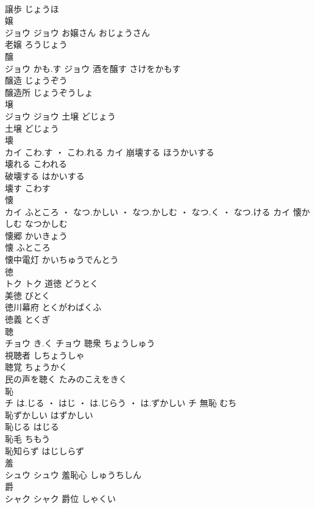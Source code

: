 \documentclass[8pt]{extreport}
\begin{document}
\begin{CJK}{UTF8}{min}
\\	譲歩	じょうほ	
\\	嬢	
\\	ジョウ		ジョウ	お嬢さん	おじょうさん	
\\	老嬢	ろうじょう	
\\	醸	
\\	ジョウ	かも.す	ジョウ	酒を醸す	さけをかもす	
\\	醸造	じょうぞう	
\\	醸造所	じょうぞうしょ	
\\	壌	
\\	ジョウ		ジョウ	土壌	どじょう	
\\	土壌	どじょう	
\\	壊	
\\	カイ	こわ.す ・ こわ.れる	カイ	崩壊する	ほうかいする	
\\	壊れる	こわれる	
\\	破壊する	はかいする	
\\	壊す	こわす	
\\	懐	
\\	カイ	ふところ ・ なつ.かしい ・ なつ.かしむ ・ なつ.く ・ なつ.ける	カイ	懐かしむ	なつかしむ	
\\	懐郷	かいきょう	
\\	懐	ふところ	
\\	懐中電灯	かいちゅうでんとう	
\\	徳	
\\	トク		トク	道徳	どうとく	
\\	美徳	びとく	
\\	徳川幕府	とくがわばくふ	
\\	徳義	とくぎ	
\\	聴	
\\	チョウ	き.く	チョウ	聴衆	ちょうしゅう	
\\	視聴者	しちょうしゃ	
\\	聴覚	ちょうかく	
\\	民の声を聴く	たみのこえをきく	
\\	恥	
\\	チ	は.じる ・ はじ ・ は.じらう ・ は.ずかしい	チ	無恥	むち	
\\	恥ずかしい	はずかしい	
\\	恥じる	はじる	
\\	恥毛	ちもう	
\\	恥知らず	はじしらず	
\\	羞	
\\	シュウ		シュウ													羞恥心	しゅうちしん	
\\	爵	
\\	シャク		シャク	爵位	しゃくい	

\end{CJK}
\end{document}
